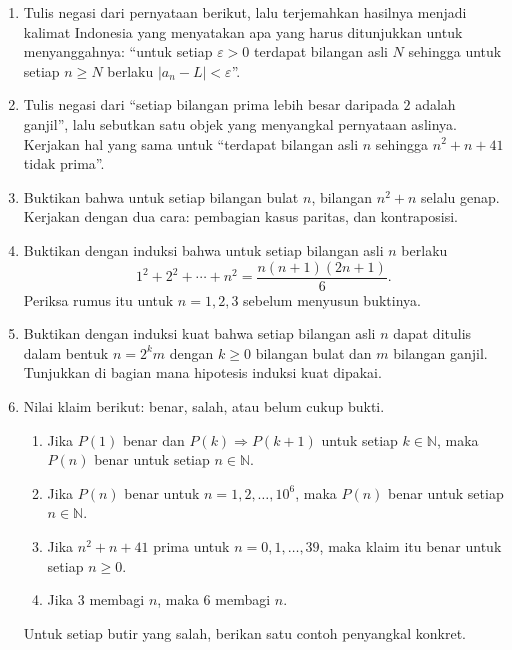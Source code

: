 \begin{latihan}
\begin{enumerate}
  \item Tulis negasi dari pernyataan berikut, lalu terjemahkan hasilnya menjadi
        kalimat Indonesia yang menyatakan apa yang harus ditunjukkan untuk
        menyanggahnya: ``untuk setiap $\varepsilon > 0$ terdapat bilangan asli $N$
        sehingga untuk setiap $n \geq N$ berlaku $|a_{n} - L| < \varepsilon$''.

  \item Tulis negasi dari ``setiap bilangan prima lebih besar daripada $2$ adalah
        ganjil'', lalu sebutkan satu objek yang menyangkal pernyataan aslinya.
        Kerjakan hal yang sama untuk ``terdapat bilangan asli $n$ sehingga
        $n^{2}+n+41$ tidak prima''.

  \item Buktikan bahwa untuk setiap bilangan bulat $n$, bilangan $n^{2}+n$ selalu
        genap. Kerjakan dengan dua cara: pembagian kasus paritas, dan kontraposisi.

  \item Buktikan dengan induksi bahwa untuk setiap bilangan asli $n$ berlaku
        \[
          1^{2} + 2^{2} + \cdots + n^{2} = \frac{n(n+1)(2n+1)}{6}.
        \]
        Periksa rumus itu untuk $n = 1, 2, 3$ sebelum menyusun buktinya.

  \item Buktikan dengan induksi kuat bahwa setiap bilangan asli $n$ dapat ditulis
        dalam bentuk $n = 2^{k}m$ dengan $k \geq 0$ bilangan bulat dan $m$ bilangan
        ganjil. Tunjukkan di bagian mana hipotesis induksi kuat dipakai.

  \item Nilai klaim berikut: benar, salah, atau belum cukup bukti.
        \begin{enumerate}
          \item Jika $P(1)$ benar dan $P(k) \Rightarrow P(k+1)$ untuk setiap
                $k \in \mathbb{N}$, maka $P(n)$ benar untuk setiap $n \in
                \mathbb{N}$.
          \item Jika $P(n)$ benar untuk $n = 1, 2, \dots, 10^{6}$, maka $P(n)$ benar
                untuk setiap $n \in \mathbb{N}$.
          \item Jika $n^{2}+n+41$ prima untuk $n = 0, 1, \dots, 39$, maka klaim itu
                benar untuk setiap $n \geq 0$.
          \item Jika $3$ membagi $n$, maka $6$ membagi $n$.
        \end{enumerate}
        Untuk setiap butir yang salah, berikan satu contoh penyangkal konkret.


\end{enumerate}
\end{latihan}
